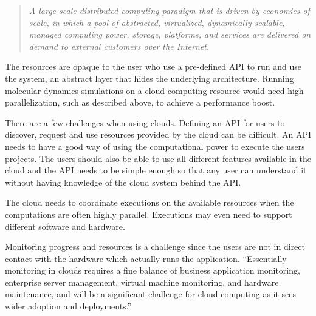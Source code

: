 \begin{quote} \slshape
  A large-scale distributed computing paradigm that is driven by
  economies of scale, in which a pool of abstracted, virtualized,
  dynamically-scalable, managed computing power, storage, platforms,
  and services are delivered on demand to external customers over
  the Internet.
\end{quote}

The resources are opaque to the user who use a pre-defined API to run
and use the system, an abstract layer that hides the underlying
architecture. Running molecular dynamics simulations on a cloud
computing resource would need high parallelization, such as described
above, to achieve a performance boost.



There are a few challenges when using clouds. Defining an API for
users to discover, request and use resources provided by the cloud can
be difficult. An API needs to have a good way of using the
computational power to execute the users projects. The users should
also be able to use all different features available in the cloud and
the API needs to be simple enough so that any user can understand it
without having knowledge of the cloud system behind the API.

The cloud needs to coordinate executions on the available resources
when the computations are often highly parallel. Executions may even
need to support different software and hardware.



Monitoring progress and resources is a challenge since the users are
not in direct contact with the hardware which actually runs the
application. ``Essentially monitoring in clouds requires a fine
balance of business application monitoring, enterprise server
management, virtual machine monitoring, and hardware maintenance, and
will be a significant challenge for cloud computing as it sees wider
adoption and deployments.''\citep{foster:2008}

